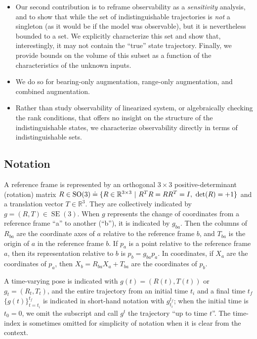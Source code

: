 \documentclass[]{article}
\def\real{\mathbb{R}}
\def\SO{\operatorname{SO}}
\def\SE{\operatorname{SE}}
\begin{document}
\begin{itemize}
\item Our second contribution is to reframe observability as a {\em sensitivity} analysis, and to show that while the set of indistinguishable trajectories is {\em not} a singleton (as it would be if the model was observable), but it is nevertheless bounded to a set. We explicitly characterize this set and show that, interestingly, it may not contain the ``true'' state trajectory. Finally, we provide bounds on the volume of this subset as a function of the characteristics of the unknown inputs.
\item We do so for bearing-only augmentation, range-only augmentation, and combined augmentation.
\item Rather than study observability of linearized system, or algebraically checking the rank conditions, that offers no insight on the structure of the indistinguishable states, we characterize observability directly in terms of indistinguishable sets.
\end{itemize}

\subsection{Notation}

A reference frame is represented by an orthogonal $3\times 3$ positive-determinant (rotation) matrix $R \in \SO(3) \doteq \{ R \in \real^{3\times 3} \ | \ R^T R = R R^T = I, \ {\rm det}(R) = +1\}$ and a translation vector $T \in \real^3$. They are collectively indicated by $g = (R, T) \in \SE(3)$. When $g$ represents the change of coordinates from a reference frame ``a'' to another (``b''), it is indicated by $g_{ba}$. Then the columns of $R_{ba}$ are the coordinate axes of $a$ relative to the reference frame $b$, and $T_{ba}$ is the origin of $a$ in the reference frame $b$. If $p_a$ is a point relative to the reference frame $a$, then its representation relative to $b$ is $p_b = g_{ba} p_a$. In coordinates, if $X_a$ are the coordinates of $p_a$, then $X_b = R_{ba}X_a + T_{ba}$ are the coordinates of $p_b$. 

A time-varying pose is indicated with $g(t) = (R(t), T(t))$ or $g_t = (R_t, T_t)$, and the entire trajectory from an initial time $t_i$ and a final time $t_f$ $\{g(t) \}_{t = t_i}^{t_f}$ is indicated in short-hand notation with $g_{t_i}^{t_f}$; when the initial time is $t_0 = 0$, we omit the subscript and call $g^{t}$ the trajectory ``up to time $t$''. The time-index is sometimes omitted for simplicity of notation when it is clear from the context.
\end{document}
